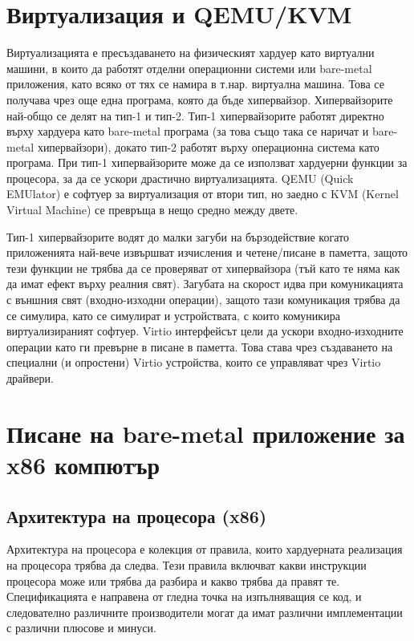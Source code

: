 \section{Виртуализация и QEMU/KVM} \label{virtualization}
Виртуализацията е пресъздаването на физическият хардуер като виртуални машини, в които да работят отделни операционни системи или bare-metal приложения, като всяко от тях се намира в т.нар. виртуална машина. Това се получава чрез още една програма, която да бъде хипервайзор.
Хипервайзорите най-общо се делят на тип-1 и тип-2. Тип-1 хипервайзорите работят директно върху хардуера като bare-metal програма (за това също така се наричат и bare-metal хипервайзори), докато тип-2 работят върху операционна система като програма.
При тип-1 хипервайзорите може да се използват хардуерни функции за процесора, за да се ускори драстично виртуализацията.\cite[глава~2.2.11]{intel-manual-1} QEMU (Quick EMUlator) е софтуер за виртуализация от втори тип, но заедно с KVM (Kernel Virtual Machine) се превръща в нещо средно между двете.

Тип-1 хипервайзорите водят до малки загуби на бързодействие когато приложенията най-вече извършват изчисления и четене/писане в паметта, защото тези функции не трябва да се проверяват от хипервайзора (тъй като те няма как да имат ефект върху реалния свят). Загубата на скорост идва при комуникацията с външния свят (входно-изходни операции)\cite[глава~``Technique~3'']{vmware-whitepaper}, защото тази комуникация трябва да се симулира, като се симулират и устройствата, с които комуникира виртуализираният софтуер. Virtio интерфейсът цели да ускори входно-изходните операции като ги превърне в писане в паметта. Това става чрез създаването на специални (и опростени) Virtio устройства, които се управляват чрез Virtio драйвери.

\section{Писане на bare-metal приложение за x86 компютър}

  \subsection{Архитектура на процесора (x86)}
  Архитектура на процесора е колекция от правила, които хардуерната реализация на процесора трябва да следва. Тези правила включват какви инструкции процесора може или трябва да разбира и какво трябва да правят те. Спецификацията е направена от гледна точка на изпълняващия се код, и следователно различните производители могат да имат различни имплементации с различни плюсове и минуси.

